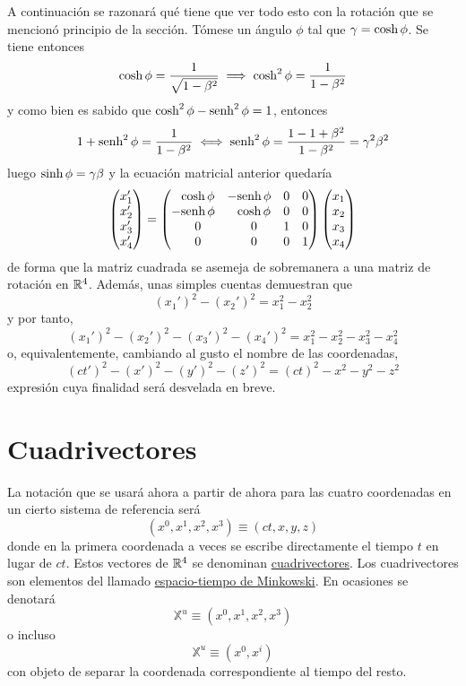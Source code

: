 \documentclass[12pt]{report}
\begin{document}
\vspace{2mm}
A continuación se razonará qué tiene que ver todo esto con la rotación que se mencionó principio de la sección. Tómese un ángulo $\phi$ tal que $\gamma = \textup{cosh} \, \phi$. Se tiene entonces
\[\textup{cosh} \, \phi = \frac{1}{\sqrt{1-\beta^2}} \implies \textup{cosh}^2 \, \phi = \frac{1}{1-\beta^2}\]
y como bien es sabido que $\textup{cosh}^2 \, \phi - \textup{senh}^2 \, \phi = 1$, entonces
\[1+\textup{senh}^2 \, \phi = \frac{1}{1-\beta^2} \iff \textup{senh}^2 \, \phi = \frac{1-1+\beta^2}{1-\beta^2} = \gamma^2 \beta^2\]
luego $\textup{sinh} \, \phi = \gamma \beta$ y la ecuación matricial anterior quedaría
\[
\begin{pmatrix}
    x_1' \\
    x_2' \\
    x_3' \\
    x_4'
\end{pmatrix} = \begin{pmatrix}
    \phantom{-}\textup{cosh} \, \phi & -\textup{senh} \, \phi & 0 & 0 \\
    -\textup{senh} \, \phi & \phantom{-}\textup{cosh} \, \phi & 0 & 0 \\
    \phantom{-}0 & \phantom{-}0 & 1 & 0 \\
    \phantom{-}0 & \phantom{-}0 & 0 & 1
\end{pmatrix} \begin{pmatrix*}[r]
    x_1 \\
    x_2 \\
    x_3 \\
    x_4
\end{pmatrix*}
\]
de forma que la matriz cuadrada se asemeja de sobremanera a una matriz de rotación en $\mathbb R^4$. Además, unas simples cuentas demuestran que
\[(x_1')^2-(x_2')^2 = x_1^2-x_2^2\]
y por tanto,
\[(x_1')^2-(x_2')^2-(x_3')^2-(x_4')^2 = x_1^2-x_2^2-x_3^2-x_4^2\]
o, equivalentemente, cambiando al gusto el nombre de las coordenadas,
\[(ct')^2-(x')^2-(y')^2-(z')^2 = (ct)^2-x^2-y^2-z^2\]
expresión cuya finalidad será desvelada en breve.

\section{Cuadrivectores}

La notación que se usará ahora a partir de ahora para las cuatro coordenadas en un cierto sistema de referencia será 
\[(x^0, x^1, x^2, x^3) \equiv (ct, x, y, z)\]
donde en la primera coordenada a veces se escribe directamente el tiempo $t$ en lugar de $ct$. Estos vectores de $\mathbb R^4$ se denominan \ul{cuadrivectores}. Los cuadrivectores son elementos del llamado \ul{espacio-tiempo de Minkowski}. En ocasiones se denotará
\[\mathbb{X}^u \equiv (x^0,x^1,x^2,x^3)\]
o incluso
\[\mathbb{X}^u \equiv (x^0, x^i)\]
con objeto de separar la coordenada correspondiente al tiempo del resto.
\end{document}
